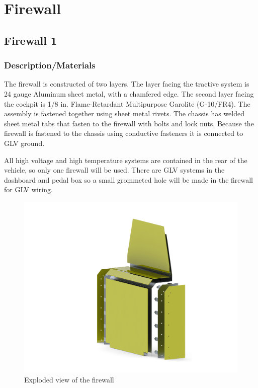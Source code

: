 \documentclass{article}
\begin{document}
{\section{Firewall}

    \subsection{Firewall 1}

        \subsubsection{Description/Materials}

            The firewall is constructed of two layers. The layer facing the tractive system is 24 gauge Aluminum sheet metal, with a chamfered edge. The second layer facing the cockpit is 1/8 in. Flame-Retardant Multipurpose Garolite (G-10/FR4). The assembly is fastened together using sheet metal rivets. The chassis has welded sheet metal tabs that fasten to the firewall with bolts and lock nuts. Because the firewall is fastened to the chassis using conductive fasteners it is connected to GLV ground.

            All high voltage and high temperature systems are contained in the rear of the vehicle, so only one firewall will be used. There are GLV systems in the dashboard and pedal box so a small grommeted hole will be made in the firewall for GLV wiring.

            \begin{figure}[H]
                \centering
                \includegraphics[width = 0.6 \textwidth]{ExplodedView}
                \caption{Exploded view of the firewall}
                \label{explodedfirewall}
            \end{figure}

}
\end{document}
